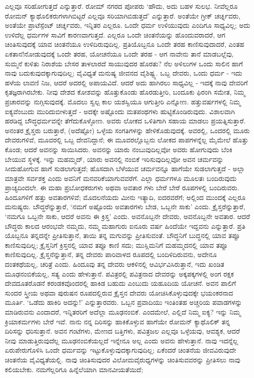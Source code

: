 ಎಲ್ಲವೂ ಸರಿಹೋಗುತ್ತದೆ ಎನ್ನುತ್ತಾರೆ. ರೋಮ್​ ನಗರದ ಪೋಪರು ‘ಹೌದು, ಅದು ಬಹಳ ಸುಲಭ. ನೀವೆಲ್ಲರೂ ರೋಮನ್ ಕ್ಯಾಥೊಲಿಕರುಗಳಾಗಿಬಿಟ್ಟರೆ ಎಲ್ಲವೂ ಸರಿಯಾಗಿಬಿಡುತ್ತದೆ’ ಎನ್ನುತ್ತಾರೆ. ಅಂತೆಯೇ ಗ್ರೀಕ್ ಚರ್ಚ್ನವರು, ಅಂತೆಯೇ ಪ್ರಾಟೆಸ್ಪೆಂಟ್ ಚರ್ಚ್ನವರು, ಇನ್ನಿತರ ಎಲ್ಲರೂ. ಒಂದೇ ಧರ್ಮ ಉಳಿಯುವುದು ಎಂದಿಗೂ ಸಾಧ್ಯವಿಲ್ಲ; ಅದು ಉಳಿದೆಲ್ಲ ಧರ್ಮಗಳ ಸಾವಿಗೆ ಕಾರಣವಾಗುತ್ತದೆ. ಎಲ್ಲರೂ ಒಂದೇ ಚಿಂತನೆಯನ್ನು ಹೊಂದುವರಾದರೆ, ಆಗ ಚಿಂತಿಸುವುದಕ್ಕೆ ಯಾವ ಚಿಂತನೆಯೂ ಉಳಿದಿರುವುದಿಲ್ಲ. ಪ್ರತಿಯೊಬ್ಬನೂ ಒಂದೇ ತರಹ ಕಾಣಿಸುವುದಾದರೆ, ಎಂತಹ ಏಕತಾನ!ನೋಡುವುದಕ್ಕೆ ಒಂದೇ ತರಹ, ಯೋಚನೆಯೂ ಒಂದೇ ತರಹ - ಆಗ ನಾವೇನು ತಾನೆ ಮಾಡಬಲ್ಲೆವು, ಸುಮ್ಮನೆ ಕುಳಿತು ನಿರಾಶೆಯ ಬೇಸರ ತಾಳಲಾರದೆ ಸಾಯುವುದರ ಹೊರತು? ನೆಲ ಅಳಿಲುಗಳ ಒಂದು ಸಾಲಿನ ಹಾಗೆ ನಾವು ಬದುಕುವುದಕ್ಕಾಗುವುದಿಲ್ಲ; ವೈವಿಧ್ಯತೆ ಮನುಷ್ಯ ಜೀವನದ ವೈಶಿಷ್ಟ್ಯ. ಒಬ್ಬ ದೇವರು, ಒಂದು ಧರ್ಮ - ಇದು ಹಳೆಯ ಲಾವಣಿ ನಿಜ, ಆದರೆ ಅದರಲ್ಲಿ ಅಪಾಯವಿದೆ. ಆದರೆ ಅದು ಹಾಗಿರಲು ಸಾಧ್ಯವಿಲ್ಲ - ಇದಕ್ಕೆ ನಾವು ದೇವರಿಗೆ ಕೃತಜ್ಞರಾಗಿರಬೇಕು. ನೀವು ದೇಶದ ಕೋಶವನ್ನು ಹೊತ್ತುಕೊಂಡು ಹೊರಡುತ್ತೀರಿ, ಬಂದೂಕು ಫಿರಂಗಿ ಸಮೇತ, ನಿಮ್ಮ ಪ್ರಚಾರವನ್ನು ನುಗ್ಗಿಸುವುದಕ್ಕೆ. ಮೊದಲು ಸ್ವಲ್ಪ ಕಾಲ ಯಶಸ್ವಿಯೂ ಆಗುತ್ತೀರಿ ಎನ್ನೋಣ. ಹತ್ತುವರ್ಷಗಳಲ್ಲಿ ನಿಮ್ಮ ಐಕ್ಯವೆಂಬುದು ಮುರಿದುಬೀಳುತ್ತದೆ - ಅದಕ್ಕೇ ಅಷ್ಟೊಂದು ಮತಪಂಥಗಳು ಹುಟ್ಟಿಕೊಂಡಿರುವುದು. ವಿಶಾಲವಾಗಿ ಹರಡಿದ್ದ ಬೌದ್ಧಧರ್ಮವನ್ನೇ ತೆಗೆದುಕೊಳ್ಳೋಣ. ಅವರು ಲೋಕದ ಒಳಿತಿಗಾಗಿ ಸಹಾಯ ಮಾಡಲು ಪ್ರಯತ್ನಿಸುತ್ತಾರೆ. ಅನಂತರ ಕ್ರೈಸ್ತರು ಬರುತ್ತಾರೆ, (ಅದೆಷ್ಟೋ) ಒಳ್ಳೆಯ ಸಂಗತಿಗಳನ್ನು ಹೇಳಿಕೊಡುವುದಕ್ಕೆ. ಅವರಲ್ಲಿ, ಒಂದರಲ್ಲಿ ಮೂರು ದೇವರುಗಳಿವೆ, ಮೂವರಲ್ಲಿ ಒಬ್ಬ ದೇವನಿದ್ದಾನೆ; ಈ ಮೂವರಲ್ಲೊಬ್ಬನು ಲೋಕದ ಪಾಪಗಳನ್ನೆಲ್ಲ ಮೈಮೇಲೆ ಹೊತ್ತು ಕೊಂಡ; ಆದರೆ ಅವನನ್ನು ಸಾಯಿಸಿದರು. ಅವನನ್ನು ಯಾರು ನಂಬುವುದಿಲ್ಲವೋ ಅವರು ಹೋಗುವುದು ಬೆಂಕಿ ಬೇಯುವ ಸ್ಥಳಕ್ಕೆ. ಇನ್ನು ಮಹಮ್ಮದ್, ಯಾರು ಅವನಲ್ಲಿ ನಂಬಿಕೆ ಇರಿಸುವುದಿಲ್ಲವೋ ಅವನ ಚರ್ಮವನ್ನು ಸೀದುಹೋಗುವ ಹಾಗೆ ಸುಡಲಾಗುತ್ತದೆ; ಹೊಸದಾಗಿ ಬೆಳೆಯುವ ಚರ್ಮವನ್ನೂ ಹಾಗೆಯೇ ಸುಡಲಾಗುತ್ತದೆ - ಅಲ್ಲಾ ಮಾತ್ರವೇ ಸರ್ವಶಕ್ತ ಎಂದು ಅವನಿಗೆ ಮನವರಿಕೆಯಾಗುವವರೆಗೆ. ಎಲ್ಲಾ ಧರ್ಮಗಳೂ ಮೂಲತಃ ಬಂದಿರುವುದು ಪ್ರಾಚ್ಯದಿಂದಲೇ. ಈ ಮಹಾ ಪ್ರಬೋಧಕರುಗಳು ಅಥವಾ ಅವತಾರ ಗಳು ಬೇರೆ ಬೇರೆ ರೂಪಗಳಲ್ಲಿ ಬಂದಿರುವರು. ಹಿಂದೂಗಳಿಗೆ ಹತ್ತು ಅವತಾರಗಳಿವೆ; ಮೊದಲನೆಯದು ಮೀನು ಇತ್ಯಾದಿ, ಐದರವರೆಗೆ; ಅಲ್ಲಿಂದ ಮುಂದಕ್ಕೆ ಎಲ್ಲರೂ ಮನುಷ್ಯರು. ಬೌದ್ಧರೆನ್ನುತ್ತಾರೆ, ‘ನಮಗೆ ಅಷ್ಟೊಂದು ಅವತಾರಗಳು ಬೇಡ, ಒಬ್ಬನೇ ಸಾಕು’ ಎಂದು. ಕ್ರೈಸ್ತರೆನ್ನುತ್ತಾರೆ, ‘ನಮಗೂ ಒಬ್ಬನೇ ಸಾಕು, ಆದರೆ ಅವನು ಈ ಕ್ರಿಸ್ತ’ ಎಂದು. ಅವನೊಬ್ಬನೇ ದೇವರು, ಅವನೊಬ್ಬನೇ ಅವತಾರ. ಆದರೆ ಬೌದ್ಧರು ಕಾಲದ ಆರಂಭವೇ ನಮ್ಮದು, ನಮ್ಮ ಮಹಾಗುರು ಐನೂರು ವರ್ಷ ಹಿಂದೆಯೇ ಇದ್ದವನು ಎನ್ನುತ್ತಾರೆ. ಪ್ರತಿ ಯೊಬ್ಬನೂ ತನ್ನದನ್ನೇ ಪ್ರೀತಿಸುತ್ತಾನೆ, ತಾಯಿ ತನ್ನ ಮಗುವನ್ನು ಪ್ರೀತಿಸುವಂತೆ. ಬೌದ್ಧನಿಗೆ ಬುದ್ಧನಲ್ಲಿ ಯಾವ ತಪ್ಪೂ ಕಾಣಿಸುವುದಿಲ್ಲ; ಕ್ರೈಸ್ತನಿಗೆ ಕ್ರಿಸ್ತನಲ್ಲಿ ಯಾವ ತಪ್ಪೂ ಕಾಣಿ ಸದು; ಮುಸ್ಲಿಮನಿಗೆ ಮಹಮ್ಮದನಲ್ಲಿ ಯಾವ ತಪ್ಪೂ ಕಾಣಿಸುವುದಿಲ್ಲ. ಕ್ರೈಸ್ತನೆನ್ನುತ್ತಾನೆ, ತನ್ನ ದೇವರು ಪಾರಿವಾಳದ ರೂಪದಲ್ಲಿ ಬಂದಿಳಿದಿರುವನು, ಅದೇನೂ ದಂತಕಥೆಯಲ್ಲ, ಚರಿತ್ರೆ ಎಂದು. ಹಿಂದೂವು ತನ್ನ ದೇವರು ಆಕಳಿನಲ್ಲಿ ಆವಿರ್ಭವಿಸಿರುತ್ತಾನೆ, ಇದು ಖಂಡಿತ ಮೂಢನಂಬಿಕೆಯಲ್ಲ, ಸತ್ಯ ಎಂದು ಹೇಳುತ್ತಾನೆ. ಪವಿತ್ರರಲ್ಲಿ ಪವಿತ್ರನಾದ ದೇವರನ್ನು ಅಕ್ಕಪಕ್ಕಗಳಲ್ಲಿ ಅಂಗ ರಕ್ಷಕ ದೇವದೂತರೊಡನೆ ಕರಂಡಕವೊಂದರಲ್ಲಿ ಹಾಕಿಡ ಬಹುದು ಎಂಬುದು ಯಹೂದಿಯ ಯೋಚನೆ. ಅವನ ಪಾಲಿಗೆ ಸುಂದರ ಸ್ತ್ರೀಯ ಅಥವಾ ಪುರುಷನ ರೂಪದಲ್ಲಿರುವ ಕ್ರೈಸ್ತನ ದೇವರು ಯೋಚಿಸಿಕೊಳ್ಳುವುದಕ್ಕೇ ಭಯಂಕರನಾದ ಮೂರ್ತಿ. ‘ಒಡೆದು ಹಾಕಿರಿ ಅದನ್ನು!’ ಎನ್ನುತ್ತಾರವರು. ಒಬ್ಬನ ಪ್ರವಾದಿಯು ಇಂತಿಂತಹ ಅಚ್ಚರಿಯ ಪವಾಡಗಳನ್ನು ಮಾಡಿರುವನು ಎಂದಾದರೆ, ಇನ್ನಿತರರಿಗೆ ಅದೆಲ್ಲಾ ಮೂಢನಂಬಿಕೆ. ಎಂದಮೇಲೆ, ಎಲ್ಲಿದೆ ನಿಮ್ಮ ಐಕ್ಯ? ಇನ್ನು ನಿಮ್ಮ ಕ್ರಿಯಾಕರ್ಮಗಳು ಬೇರೆ ಇವೆ. ನಾನು ನನ್ನ ದಿರಿಸನ್ನು ಹಾಕಿಕೊಳ್ಳುವ ಹಾಗೆಯೇ ರೋಮನ್ ಕ್ಯಾಥೊಲಿಕ್ ತನ್ನ ದಿರಿಸನ್ನು ಧರಿಸುತ್ತಾನೆ. ಅವನ ಗಂಟೆಗಳು, ಮೇಣದ ಬತ್ತಿಗಳು, ಪವಿತ್ರಜಲ ಎಲ್ಲವೂ ಒಳ್ಳೆಯವು, ಆವಶ್ಯಕ, ಆದರೆ ನೀವು ಮಾಡುತ್ತಿರುವುದೆಲ್ಲ ಮೂಢನಂಬಿಕೆಯಲ್ಲದೆ ಇನ್ನೇನೂ ಅಲ್ಲ ಎಂದು ಅವನು ಹೇಳುತ್ತಾನೆ. ನಾವು ಇದನ್ನೆಲ್ಲ ಏರುಪೇರುಗೊಳಿಸಿ ಒಂದೇ ಧರ್ಮವನ್ನು ಇಟ್ಟುಕೊಳ್ಳುವುದಕ್ಕಾಗುವುದಿಲ್ಲ; ಏಕೆಂದರೆ ಚಿಂತನೆಯ ಜೀವವಿರುವುದೇ ಚಿಂತನೆಯ ವೈವಿಧ್ಯತೆಯಲ್ಲಿ. ನಾವು ಚಿಂತಿಸುವುದರ ವಿಲೋಮವೈರುಧ್ಯಗಳನ್ನು ಚಿಂತಿಸುವವರನ್ನು ಪ್ರೀತಿಸಲು ನಾವು ಕಲಿಯಬೇಕು. ನಮಗೆಲ್ಲರಿಗೂ ಹಿನ್ನೆಲೆಯಾಗಿ ಮಾನವೀಯತೆಯಿದೆ; 